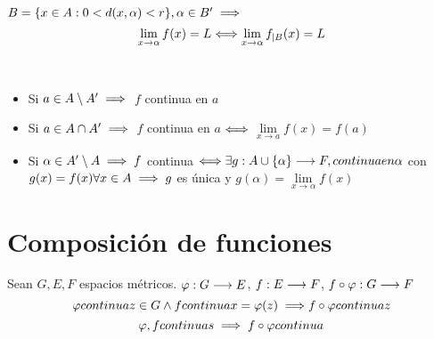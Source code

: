 \begin{prop}
    $B = \{ x\in A : 0 < d(x,\alpha) < r\}, \\ \alpha \in B'\implies$
    $$\lim\limits_{x \to \alpha} f(x) = L \Longleftrightarrow \lim\limits_{x \to \alpha} f_{|B}(x) = L$$
\end{prop}

\begin{prop} \\
    \begin{itemize}
        \item Si $a\in A\setminus A' \\ \implies$ $f$ continua en $a$
        \item Si $a\in A\cap A' \\ \implies$ $f$ continua en $a$ $\Longleftrightarrow$ $\lim\limits_{x \to a} f(x) = f(a)$
        \item Si $\alpha\in A'\setminus A \implies f$ continua $\Longleftrightarrow \exists g:A\cup \{\alpha\} \longrightarrow F, \\ continua \\ en \\ \alpha$ con $g(x) = f(x) \\ \forall x \in A \\ \implies g$ es única y $g(\alpha) = \lim\limits_{x\to \alpha} f(x)$ 
    \end{itemize}
\end{prop}


\section{Composición de funciones}
\begin{prop}
    Sean $G,E,F$ espacios métricos. $\varphi:G\longrightarrow E$, $f:E \longrightarrow F$, $f\circ\varphi:G\longrightarrow F$ 
    $$\varphi \\ continua \\ z\in G \\ \land  \\ f \\ continua \\ x = \varphi (z) \\ \implies \\ f\circ\varphi \\ continua \\ z$$
    $$\varphi, f \\ continuas \implies f\circ \varphi \\ continua$$
\end{prop}


